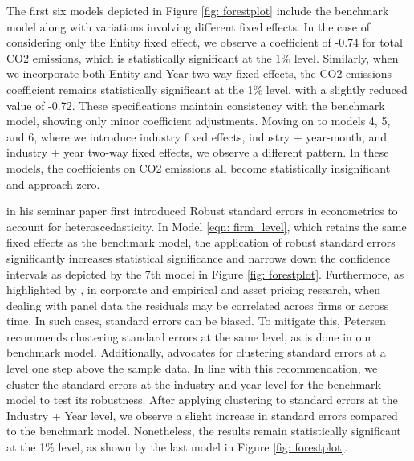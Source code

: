 \documentclass[12pt]{article}
\begin{document}
The first six models depicted in Figure \ref{fig: forestplot} include the benchmark model along with variations involving different fixed effects. In the case of considering only the Entity fixed effect, we observe a coefficient of -0.74 for total CO2 emissions, which is statistically significant at the 1\% level. Similarly, when we incorporate both Entity and Year two-way fixed effects, the CO2 emissions coefficient remains statistically significant at the 1\% level, with a slightly reduced value of -0.72. These specifications maintain consistency with the benchmark model, showing only minor coefficient adjustments. Moving on to models 4, 5, and 6, where we introduce industry fixed effects, industry + year-month, and industry + year two-way fixed effects, we observe a different pattern. In these models, the coefficients on CO2 emissions all become statistically insignificant and approach zero.

\cite{white1980heteroskedasticity} in his seminar paper first introduced Robust standard errors in econometrics to account for heteroscedasticity. In Model \ref{eqn: firm_level}, which retains the same fixed effects as the benchmark model, the application of robust standard errors significantly increases statistical significance and narrows down the confidence intervals as depicted by the 7th model in Figure \ref{fig: forestplot}. Furthermore, as highlighted by \cite{petersen2008estimating}, in corporate and empirical and asset pricing research, when dealing with panel data the residuals may be correlated across firms or across time. In such cases, standard errors can be biased. To mitigate this, Petersen recommends clustering standard errors at the same level, as is done in our benchmark model. Additionally, \cite{angrist2009mostly} advocates for clustering standard errors at a level one step above the sample data. In line with this recommendation, we cluster the standard errors at the industry and year level for the benchmark model to test its robustness. After applying clustering to standard errors at the Industry + Year level, we observe a slight increase in standard errors compared to the benchmark model. Nonetheless, the results remain statistically significant at the 1\% level, as shown by the last model in Figure \ref{fig: forestplot}.
\end{document}

